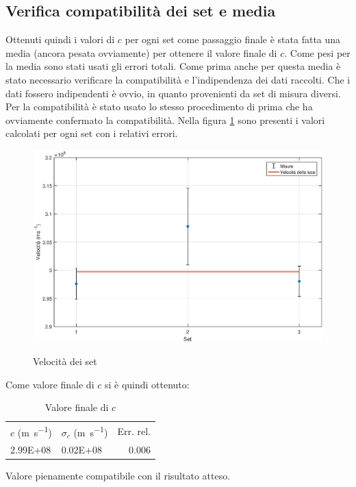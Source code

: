 \documentclass[a4paper,11pt]{article}
\begin{document}
	\subsection{Verifica compatibilità dei set e media}
	Ottenuti quindi i valori di $ c $ per ogni set come passaggio finale è stata fatta una media (ancora pesata ovviamente) per ottenere il valore finale di $ c $. Come pesi per la media sono stati usati gli errori totali. Come prima anche per questa media è stato necessario verificare la compatibilità e l'indipendenza dei dati raccolti. Che i dati fossero indipendenti è ovvio, in quanto provenienti da set di misura diversi. Per la compatibilità è stato usato lo stesso procedimento di prima che ha ovviamente confermato la compatibilità. Nella figura \ref{fig:setplot} sono presenti i valori calcolati per ogni set con i relativi errori.
	
	\begin{figure}
		\centering
		\caption{Velocità dei set}
		\includegraphics[width=.98\textwidth]{setplot}
		\label{fig:setplot}
	\end{figure}
	 
	 Come valore finale di $c$ si è quindi ottenuto:
	 \begin{table}[htbp]
	 	\centering
	 	\caption{Valore finale di $ c $}
	 	\vspace{0.1cm}
	 	\begin{tabular}{llr}
	 		\rowcolor[rgb]{ .741,  .843,  .933} $c$ (\si{\meter\per\second}) & $\sigma_c$ (\si{\meter\per\second}) & \multicolumn{1}{l}{Err. rel.} \\
	 		\rowcolor[rgb]{ .859,  .859,  .859} \num{2.99E+08} & \num{0.02E+08} & 0.006 \\
	 	\end{tabular}%
	 	\label{tab:cfinal}%
	 \end{table}%
	 
	 
	 Valore pienamente compatibile con il risultato atteso.
	
	
\end{document}
